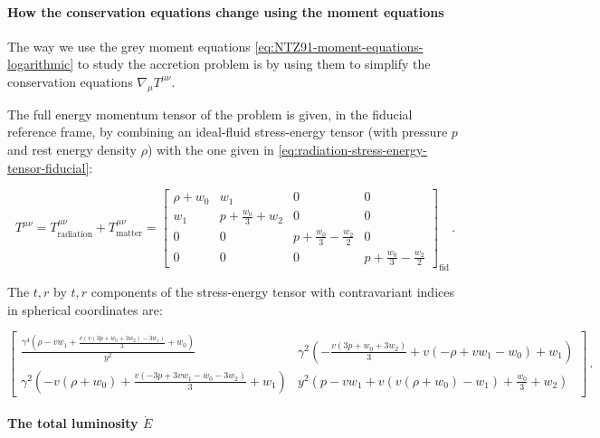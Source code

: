 \documentclass[main.tex]{subfiles}
\begin{document}
\paragraph{How the conservation equations change using the moment equations}

The way we use the grey moment equations \eqref{eq:NTZ91-moment-equations-logarithmic} to study the accretion problem is by using them to simplify the conservation equations \(\nabla_\mu T^{\mu\nu}\).

The full energy momentum tensor of the problem is given, in the fiducial reference frame, by combining an ideal-fluid stress-energy tensor (with pressure \(p\) and rest energy density \(\rho\)) with the one given in \eqref{eq:radiation-stress-energy-tensor-fiducial}:

\begin{equation}
    T^{\mu\nu} =
    T^{\mu\nu}_{\text{radiation}} +
    T^{\mu\nu}_{\text{matter}} =
    \left[\begin{matrix}\rho + w_{0} & w_{1} & 0 & 0\\w_{1} & p + \frac{w_{0}}{3} + w_{2} & 0 & 0\\0 & 0 & p + \frac{w_{0}}{3} - \frac{w_{2}}{2} & 0\\0 & 0 & 0 & p + \frac{w_{0}}{3} - \frac{w_{2}}{2}\end{matrix}\right] _{\text{fid}}\,.
\end{equation}

The \(t,r\) by \(t, r\) components of the stress-energy tensor with contravariant indices in spherical coordinates are:

\begin{equation} \label{eq:spherical-coordinates-full-stress-energy-tensor}
      \left[
      \begin{matrix}
      \frac{\gamma^{4} \left(\rho - v w_{1} + \frac{v \left(v \left(3 p + w_{0} + 3 w_{2}\right) - 3 w_{1}\right)}{3} + w_{0}\right)}{y^{2}} &
      \gamma^{2} \left(- \frac{v \left(3 p + w_{0} + 3 w_{2}\right)}{3} + v \left(- \rho + v w_{1} - w_{0}\right) + w_{1}\right)\\
      \gamma^{2} \left(- v \left(\rho + w_{0}\right) + \frac{v \left(- 3 p + 3 v w_{1} - w_{0} - 3 w_{2}\right)}{3} + w_{1}\right) &
      y^{2} \left(p - v w_{1} + v \left(v \left(\rho + w_{0}\right) - w_{1}\right) + \frac{w_{0}}{3} + w_{2}\right)
    \end{matrix}
      \right] \,.
\end{equation}

\paragraph{The total luminosity \(\dot{E}\)}
\end{document}
